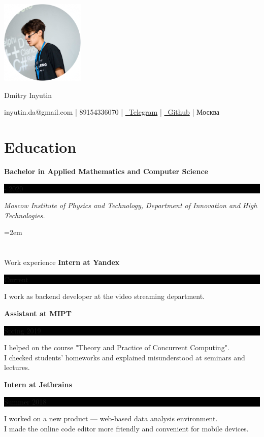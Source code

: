 \documentclass[fontsize=11pt]{article}
\newcommand{\MyName}[1]{ %
    \Huge \centering #1
    \par \normalsize \normalfont}
\newcommand{\NewPart}[1]{\section*{#1}}
\newcommand{\EducationEntry}[4]{
    \noindent \textbf{#1} \hfill      %
    \colorbox{Black}{
      \parbox{10em}{
      \color{White} \centering #2}} \par   %
    \noindent \textit{#3} \par        %
    \noindent\hangindent=2em\hangafter=0 \small #4 %
    \normalsize \par}
\newcommand{\WorkEntry}[3]{       %
    \noindent \large \textbf{#1} \hfill      %
    \colorbox{Black}{%
      \parbox{10em}{%
      \color{White} \centering #2}} \par  %
    \noindent \small #3 %
    \normalsize \par}
\begin{document}
\begin{minipage}{0.2\textwidth}%
\includegraphics[width=4cm]{me.png}
\end{minipage}%
\hfill%
\begin{minipage}{14cm}\raggedright
\bigskip
\bigskip
\bigskip
\bigskip
\bigskip
\bigskip
\MyName{Dmitry Inyutin}
\bigskip
{inyutin.da@gmail.com | 89154336070 | \href{https://t.me/inyutin}{\faTelegram \, Telegram} | \href{https://github.com/inyutin}{\faGithub \, Github} | Москва}
\end{minipage}



\NewPart{Education}{}
\EducationEntry
{Bachelor in Applied Mathematics and Computer Science}
{2016 - 2020}
{Moscow Institute of Physics and Technology, Department of Innovation and High Technologies.}

\NewPart{Work experience}{}
\WorkEntry
{Intern at Yandex}
{Current}
{I work as backend developer at the video streaming department.}

\bigskip

\WorkEntry
{Assistant at MIPT}
{Spring 2019}
{I helped on the course "Theory and Practice of Concurrent Computing". \\ I checked students' homeworks and explained misunderstood at seminars and lectures.}

\bigskip

\WorkEntry
{Intern at Jetbrains}
{Summer 2018}
{I worked on a new product — web-based data analysis environment. \\ I made the online code editor more friendly and convenient for mobile devices.}
\end{document}
